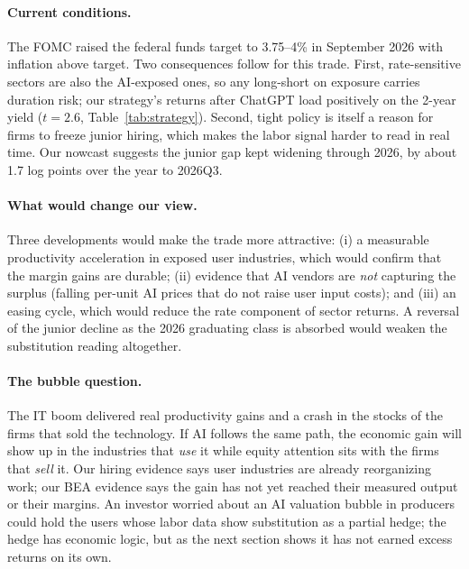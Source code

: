 \paragraph{Current conditions.} The FOMC raised the federal funds target to 3.75--4\% in September 2026 with inflation above target. Two consequences follow for this trade. First, rate-sensitive sectors are also the AI-exposed ones, so any long-short on exposure carries duration risk; our strategy's returns after ChatGPT load positively on the 2-year yield ($t=2.6$, Table~\ref{tab:strategy}). Second, tight policy is itself a reason for firms to freeze junior hiring, which makes the labor signal harder to read in real time. Our nowcast suggests the junior gap kept widening through 2026, by about 1.7 log points over the year to 2026Q3.

\paragraph{What would change our view.} Three developments would make the trade more attractive: (i) a measurable productivity acceleration in exposed user industries, which would confirm that the margin gains are durable; (ii) evidence that AI vendors are \emph{not} capturing the surplus (falling per-unit AI prices that do not raise user input costs); and (iii) an easing cycle, which would reduce the rate component of sector returns. A reversal of the junior decline as the 2026 graduating class is absorbed would weaken the substitution reading altogether.

\paragraph{The bubble question.} The IT boom delivered real productivity gains and a crash in the stocks of the firms that sold the technology. If AI follows the same path, the economic gain will show up in the industries that \emph{use} it while equity attention sits with the firms that \emph{sell} it. Our hiring evidence says user industries are already reorganizing work; our BEA evidence says the gain has not yet reached their measured output or their margins. An investor worried about an AI valuation bubble in producers could hold the users whose labor data show substitution as a partial hedge; the hedge has economic logic, but as the next section shows it has not earned excess returns on its own.
